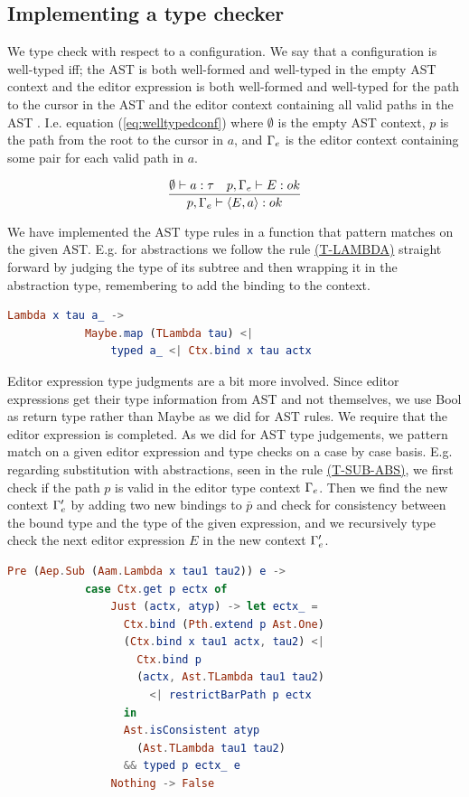 \subsection{Implementing a type checker}

We type check with respect to a
configuration. We say that a configuration is well-typed iff; the AST is both
well-formed and well-typed in the empty AST context and the editor expression
is both well-formed and well-typed for the path to the cursor in the AST and
the editor context containing all valid paths in the AST \pepm. I.e. equation
(\ref{eq:welltypedconf}) where $\emptyset$ is the empty AST context, $p$ is the
path from the root to the cursor in $a$, and $\Gamma_{e}$ is the editor context
containing some pair for each valid path in $a$.

\begin{equation}\label{eq:welltypedconf}
  \frac{\emptyset \vdash a : \tau \quad p,\Gamma_{e} \vdash E : ok} {p,\Gamma_{e} \vdash \langle E,a \rangle : ok}\\ 
\end{equation}

We have implemented the AST type rules in a function that pattern matches on
the given AST. E.g. for abstractions we follow the rule
\hyperref[fig:asttyperules]{(T-LAMBDA)} straight forward by judging the type of
its subtree and then wrapping it in the abstraction type, remembering to add
the binding to the context.

\begin{lstlisting}[language=elm,%
                    gobble=8,%
                    mathescape,%
                    ]
        Lambda x tau a_ ->
            Maybe.map (TLambda tau) <|
                typed a_ <| Ctx.bind x tau actx
\end{lstlisting}

Editor expression type judgments are a bit more involved. Since editor
expressions get their type information from AST and not themselves, we use Bool
as return type rather than Maybe as we did for AST rules. We require that the
editor expression is completed. As we did for AST type judgements, we pattern
match on a given editor expression and type checks on a case by case basis.
E.g. regarding substitution with abstractions, seen in the rule
\hyperref[fig:edttyperules]{(T-SUB-ABS)}, we first check if the path $p$ is
valid in the editor type context $\Gamma_{e}$. Then we find the new context
$\Gamma_{e}'$ by adding two new bindings to $\bar{p}$ and check for consistency
between the bound type and the type of the given expression, and we recursively
type check the next editor expression $E$ in the new context $\Gamma_{e}'$.
\begin{lstlisting}[language=elm,%
                    gobble=8,%
                    mathescape,%
                    ]
        Pre (Aep.Sub (Aam.Lambda x tau1 tau2)) e ->
            case Ctx.get p ectx of
                Just (actx, atyp) -> let ectx_ =
                  Ctx.bind (Pth.extend p Ast.One)
                  (Ctx.bind x tau1 actx, tau2) <|
                    Ctx.bind p
                    (actx, Ast.TLambda tau1 tau2)
                      <| restrictBarPath p ectx
                  in
                  Ast.isConsistent atyp
                    (Ast.TLambda tau1 tau2)
                  && typed p ectx_ e
                Nothing -> False
\end{lstlisting}

